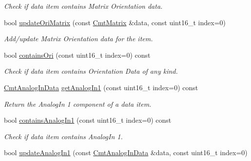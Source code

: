 \begin{DoxyCompactItemize}
\begin{DoxyCompactList}\small\item\em \-Check if data item contains \-Matrix \-Orientation data. \end{DoxyCompactList}\item 
\hypertarget{classxsens_1_1Packet_a8544d9389795e0aef9cf860c5f58c67b}{bool \hyperlink{classxsens_1_1Packet_a8544d9389795e0aef9cf860c5f58c67b}{update\-Ori\-Matrix} (const \hyperlink{structCmtMatrix}{\-Cmt\-Matrix} \&data, const uint16\-\_\-t index=0)}\label{classxsens_1_1Packet_a8544d9389795e0aef9cf860c5f58c67b}

\begin{DoxyCompactList}\small\item\em \-Add/update \-Matrix \-Orientation data for the item. \end{DoxyCompactList}\item 
\hypertarget{classxsens_1_1Packet_a62993410293b6d73bef4736e9ddedbb1}{bool \hyperlink{classxsens_1_1Packet_a62993410293b6d73bef4736e9ddedbb1}{contains\-Ori} (const uint16\-\_\-t index=0) const }\label{classxsens_1_1Packet_a62993410293b6d73bef4736e9ddedbb1}

\begin{DoxyCompactList}\small\item\em \-Check if data item contains \-Orientation \-Data of any kind. \end{DoxyCompactList}\item 
\hyperlink{structCmtAnalogInData}{\-Cmt\-Analog\-In\-Data} \hyperlink{classxsens_1_1Packet_a8bd6d3d77d3bacb46a3ad3f1c9d9c2db}{get\-Analog\-In1} (const uint16\-\_\-t index=0) const 
\begin{DoxyCompactList}\small\item\em \-Return the \-Analog\-In 1 component of a data item. \end{DoxyCompactList}\item 
\hypertarget{classxsens_1_1Packet_ad45b135322eb61ecc86d39c02d52fa20}{bool \hyperlink{classxsens_1_1Packet_ad45b135322eb61ecc86d39c02d52fa20}{contains\-Analog\-In1} (const uint16\-\_\-t index=0) const }\label{classxsens_1_1Packet_ad45b135322eb61ecc86d39c02d52fa20}

\begin{DoxyCompactList}\small\item\em \-Check if data item contains \-Analog\-In 1. \end{DoxyCompactList}\item 
\hypertarget{classxsens_1_1Packet_a10fa127a2352db0266447963ee506ab0}{bool \hyperlink{classxsens_1_1Packet_a10fa127a2352db0266447963ee506ab0}{update\-Analog\-In1} (const \hyperlink{structCmtAnalogInData}{\-Cmt\-Analog\-In\-Data} \&data, const uint16\-\_\-t index=0)}\label{classxsens_1_1Packet_a10fa127a2352db0266447963ee506ab0}


\end{DoxyCompactItemize}
